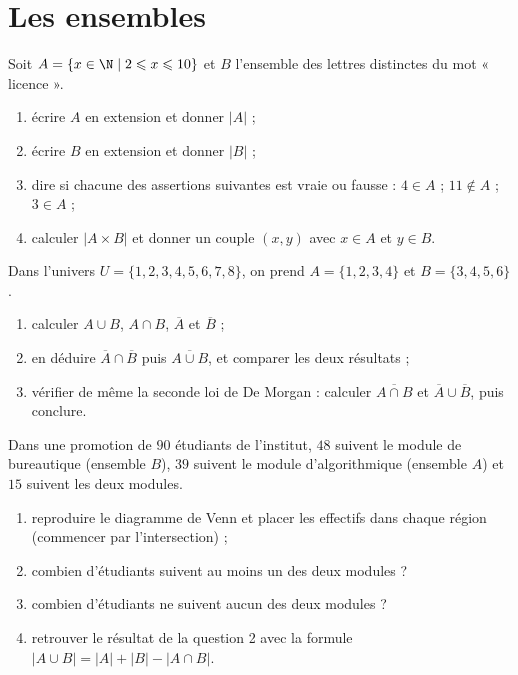 \chapter{Les ensembles}

\begin{exercice}
Soit $A = \{x \in \N \mid 2 \leqslant x \leqslant 10\}$ et $B$ l'ensemble des lettres distinctes du mot « licence ».
\begin{enumerate}
\item écrire $A$ en extension et donner $|A|$ ;
\item écrire $B$ en extension et donner $|B|$ ;
\item dire si chacune des assertions suivantes est vraie ou fausse : $4 \in A$ ; $11 \notin A$ ; $3 \in A$ ;
\item calculer $|A \times B|$ et donner un couple $(x, y)$ avec $x \in A$ et $y \in B$.
\end{enumerate}
\end{exercice}

\begin{exercice}
Dans l'univers $U = \{1, 2, 3, 4, 5, 6, 7, 8\}$, on prend $A = \{1, 2, 3, 4\}$ et $B = \{3, 4, 5, 6\}$.
\begin{enumerate}
\item calculer $A \cup B$, $A \cap B$, $\overline{A}$ et $\overline{B}$ ;
\item en déduire $\overline{A} \cap \overline{B}$ puis $\overline{A \cup B}$, et comparer les deux résultats ;
\item vérifier de même la seconde loi de De Morgan : calculer $\overline{A \cap B}$ et $\overline{A} \cup \overline{B}$, puis conclure.
\end{enumerate}
\end{exercice}

\begin{exercice}
Dans une promotion de $90$ étudiants de l'institut, $48$ suivent le module de bureautique (ensemble $B$), $39$ suivent le module d'algorithmique (ensemble $A$) et $15$ suivent les deux modules.
\begin{enumerate}
\item reproduire le diagramme de Venn et placer les effectifs dans chaque région (commencer par l'intersection) ;
\item combien d'étudiants suivent au moins un des deux modules ?
\item combien d'étudiants ne suivent aucun des deux modules ?
\item retrouver le résultat de la question 2 avec la formule $|A \cup B| = |A| + |B| - |A \cap B|$.
\end{enumerate}
\end{exercice}

